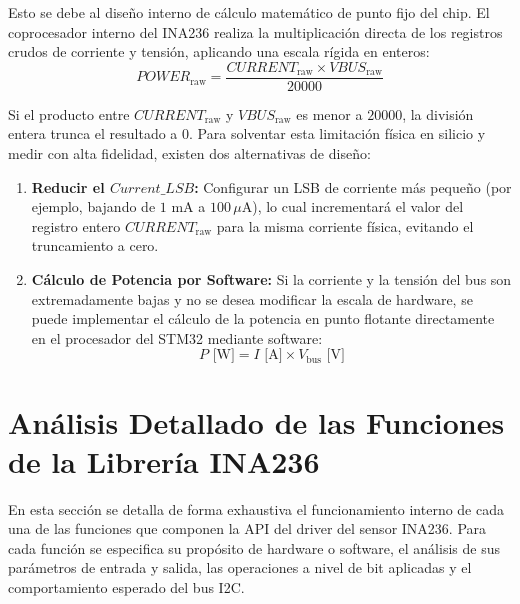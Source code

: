 \documentclass[
10pt, %
a4paper, %
oneside, %
headinclude,footinclude, %
BCOR5mm, %
]{scrartcl}
\begin{document}
Esto se debe al diseño interno de cálculo matemático de punto fijo del chip. El coprocesador interno del INA236 realiza la multiplicación directa de los registros crudos de corriente y tensión, aplicando una escala rígida en enteros:
\begin{equation}
	POWER_{\text{raw}} = \frac{CURRENT_{\text{raw}} \times VBUS_{\text{raw}}}{20000}
\end{equation}

Si el producto entre $CURRENT_{\text{raw}}$ y $VBUS_{\text{raw}}$ es menor a $20000$, la división entera trunca el resultado a $0$. Para solventar esta limitación física en silicio y medir con alta fidelidad, existen dos alternativas de diseño:
\begin{enumerate}
	\item \textbf{Reducir el $Current\_LSB$:} Configurar un LSB de corriente más pequeño (por ejemplo, bajando de $1\text{ mA}$ a $100\,\mu\text{A}$), lo cual incrementará el valor del registro entero $CURRENT_{\text{raw}}$ para la misma corriente física, evitando el truncamiento a cero.
	\item \textbf{Cálculo de Potencia por Software:} Si la corriente y la tensión del bus son extremadamente bajas y no se desea modificar la escala de hardware, se puede implementar el cálculo de la potencia en punto flotante directamente en el procesador del STM32 mediante software:
	\begin{equation}
		P\text{ [W]} = I\text{ [A]} \times V_{\text{bus}}\text{ [V]}
	\end{equation}
\end{enumerate}

\newpage
\section{Análisis Detallado de las Funciones de la Librería INA236}

En esta sección se detalla de forma exhaustiva el funcionamiento interno de cada una de las funciones que componen la API del driver del sensor INA236. Para cada función se especifica su propósito de hardware o software, el análisis de sus parámetros de entrada y salida, las operaciones a nivel de bit aplicadas y el comportamiento esperado del bus I2C.
\end{document}
